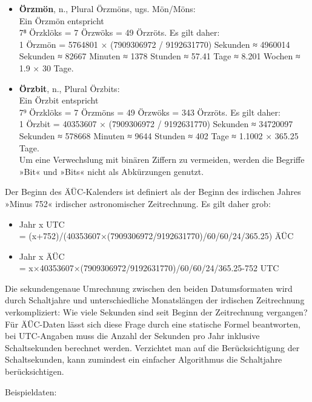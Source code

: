\begin{itemize}
    \item \textbf{Örzmön}, n., Plural Örzmöns, ugs. Mön/Möns:\\ Ein Örzmön entspricht\\ 7⁸ Örzklöks = 7 Örzwöks = 49 Örzröts. Es gilt daher:\\ 1 Örzmön = 5764801 × (7909306972 / 9192631770) Sekunden ≈ 4960014 Sekunden ≈ 82667 Minuten ≈ 1378 Stunden ≈ 57.41 Tage ≈ 8.201 Wochen ≈ 1.9 × 30 Tage.
    \item \textbf{Örzbit}, n., Plural Örzbits:\\ Ein Örzbit entspricht\\ 7⁹ Örzklöks = 7 Örzmöns = 49 Örzwöks = 343 Örzröts. Es gilt daher:\\ 1 Örzbit = 40353607 × (7909306972 / 9192631770) Sekunden ≈ 34720097 Sekunden ≈ 578668 Minuten ≈ 9644 Stunden ≈ 402 Tage ≈ 1.1002 × 365.25 Tage.\\ Um eine Verwechslung mit binären Ziffern zu vermeiden, werden die Begriffe »Bit« und »Bits« nicht als Abkürzungen genutzt.
\end{itemize}

Der Beginn des ÄÜC-Kalenders ist definiert als der Beginn des irdischen Jahres »Minus 752« irdischer astronomischer Zeitrechnung. Es gilt daher grob:

\begin{itemize}
    \item Jahr x UTC\\ = (x+752)/(40353607×(7909306972/9192631770)/60/60/24/365.25) ÄÜC
    \item Jahr x ÄÜC\\ = x×40353607×(7909306972/9192631770)/60/60/24/365.25-752 UTC
\end{itemize}

Die sekundengenaue Umrechnung zwischen den beiden Datumsformaten wird durch Schaltjahre und unterschiedliche Monatslängen der irdischen Zeitrechnung verkompliziert: Wie viele Sekunden sind seit Beginn der Zeitrechnung vergangen? Für ÄÜC-Daten lässt sich diese Frage durch eine statische Formel beantworten, bei UTC-Angaben muss die Anzahl der Sekunden pro Jahr inklusive Schaltsekunden berechnet werden. Verzichtet man auf die Berücksichtigung der Schaltsekunden, kann zumindest ein einfacher Algorithmus die Schaltjahre berücksichtigen.

Beispieldaten:

